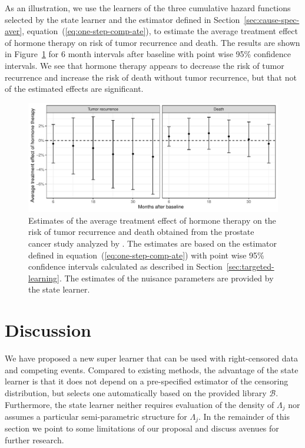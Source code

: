 \documentclass{statsoc}
\numberwithin{theorem}{section}
\newcommand{\1}{\mathds{1}}
\begin{document}
As an illustration, we use the learners of the three cumulative hazard functions
selected by the state learner and the estimator defined in
Section~\ref{sec:cause-spec-aver}, equation~(\ref{eq:one-step-comp-ate}), to
estimate the average treatment effect of hormone therapy on risk of tumor
recurrence and death. The results are shown in
Figure~\ref{fig:zelefski-real-target} for 6 month intervals after baseline with
point wise 95\% confidence intervals. We see that hormone therapy appears to
decrease the risk of tumor recurrence and increase the risk of death without
tumor recurrence, but that not of the estimated effects are significant.

\begin{figure}
  \centerline{\includegraphics[width=1\linewidth]{./zelefsky-data-target-par.pdf}}
  \caption[]{Estimates of the average treatment effect of hormone therapy on the
    risk of tumor recurrence and death obtained from the prostate cancer study
    analyzed by \cite{kattan2000pretreatment}. The estimates are based on the
    estimator defined in equation~(\ref{eq:one-step-comp-ate}) with point wise
    95\% confidence intervals calculated as described in
    Section~\ref{sec:targeted-learning}. The estimates of the nuisance
    parameters are provided by the state learner.}
  \label{fig:zelefski-real-target}
\end{figure}



\section{Discussion}
\label{sec:discussion}

We have proposed a new super learner that can be used with right-censored data
and competing events. Compared to existing methods, the advantage of the state
learner is that it does not depend on a pre-specified estimator of the censoring
distribution, but selects one automatically based on the provided library
\( \mathcal{B} \). Furthermore, the state learner neither requires evaluation of
the density of \( \Lambda_j \) nor assumes a particular semi-parametric
structure for $\Lambda_j$. In the remainder of this section we point to some
limitations of our proposal and discuss avenues for further research.
\end{document}
